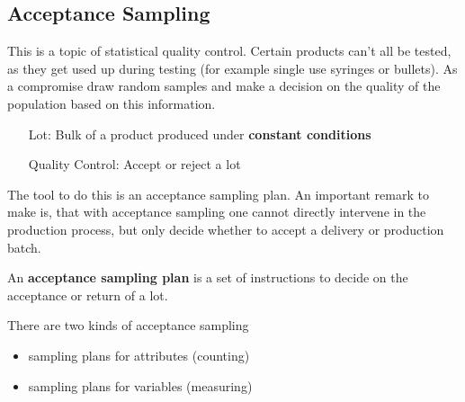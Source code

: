 \documentclass[11pt]{article}
\theoremstyle{definition}
\begin{document}
\subsection{Acceptance Sampling}
This is a topic of statistical quality control. Certain products can't all be tested, as they get used up during testing (for example single use syringes or bullets). As a compromise draw random samples and make a decision on the quality of the population based on this information.
\begin{itemize}[leftmargin=*, labelindent=3cm, labelsep=0.5cm]
	\item[Lot:] Bulk of a product produced under \textbf{constant conditions}
	\item[Quality Control:] Accept or reject a lot
\end{itemize}
The tool to do this is an acceptance sampling plan. An important remark to make is, that with acceptance sampling one cannot directly intervene in the production process, but only decide whether to accept a delivery or production batch.
\begin{definition}
	An \textbf{acceptance sampling plan} is a set of instructions to decide on the acceptance or return of a lot.
\end{definition}
There are two kinds of acceptance sampling
\begin{itemize}
	\item sampling plans for attributes (counting)
	\item sampling plans for variables (measuring)
\end{itemize}
\end{document}
